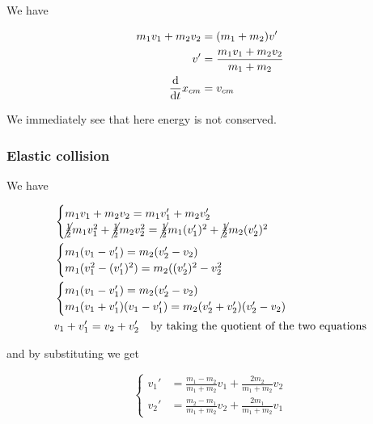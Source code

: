 \documentclass[10pt]{extarticle}
\begin{document}
We have

\begin{align*}
    m_1 v_1 + m_2 v_2 & = (m_1 + m_2) v'                      \\
    v'                & = \frac{m_1 v_1 + m_2 v_2}{m_1 + m_2} \\
    \dv{t} x_{cm}     & = v_{cm}
\end{align*}

We immediately see that here energy is not conserved.

\subsubsection{Elastic collision}

We have

\begin{align*}
     & \begin{cases}
           m_1 v_1 + m_2 v_2 = m_1 v_1' + m_2 v_2' \\
           \cancel{\frac{1}{2}} m_1 v_1^2 + \cancel{\frac{1}{2}} m_2 v_2^2 = \cancel{\frac{1}{2}} m_1 (v_1')^2 + \cancel{\frac{1}{2}} m_2 (v_2')^2
       \end{cases} \\
     & \begin{cases}
           m_1(v_1 - v_1') = m_2(v_2' - v_2) \\
           m_1 (v_1^2 - (v_1')^2) = m_2 ((v_2')^2 - v_2^2
       \end{cases}                                                                                                                                          \\
     & \begin{cases}
           m_1(v_1 - v_1') = m_2(v_2' - v_2) \\
           m_1 (v_1 + v_1')(v_1 - v_1') = m_2 (v_2' + v_2')(v_2' - v_2)
       \end{cases}                                                                                                                            \\
     & v_1 + v_1' = v_2 + v_2'  \quad \text{by taking the quotient of the two equations}                                                                                                      \\
\end{align*}

and by substituting we get

$$
    \begin{cases}
        v_1' & = \frac{m_1 - m_2}{m_1 + m_2} v_1 + \frac{2 m_2}{m_1 + m_2} v_2 \\
        v_2' & = \frac{m_2 - m_1}{m_1 + m_2} v_2 + \frac{2 m_1}{m_1 + m_2} v_1
    \end{cases}
$$
\end{document}
